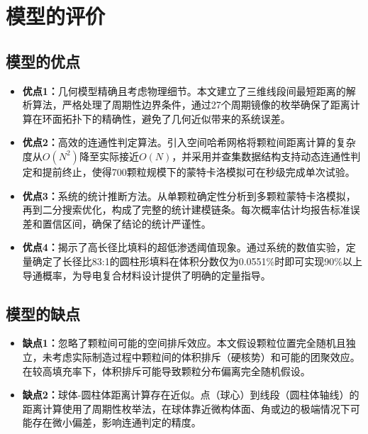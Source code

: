 
\section{模型的评价}

\subsection{模型的优点}
\begin{itemize}[itemindent=2em]
\item \textbf{优点1：}几何模型精确且考虑物理细节。本文建立了三维线段间最短距离的解析算法，严格处理了周期性边界条件，通过27个周期镜像的枚举确保了距离计算在环面拓扑下的精确性，避免了几何近似带来的系统误差。
\item \textbf{优点2：}高效的连通性判定算法。引入空间哈希网格将颗粒间距离计算的复杂度从$O(N^2)$降至实际接近$O(N)$，并采用并查集数据结构支持动态连通性判定和提前终止，使得700颗粒规模下的蒙特卡洛模拟可在秒级完成单次试验。
\item \textbf{优点3：}系统的统计推断方法。从单颗粒确定性分析到多颗粒蒙特卡洛模拟，再到二分搜索优化，构成了完整的统计建模链条。每次概率估计均报告标准误差和置信区间，确保了结论的统计严谨性。
\item \textbf{优点4：}揭示了高长径比填料的超低渗透阈值现象。通过系统的数值实验，定量确定了长径比83:1的圆柱形填料在体积分数仅为0.0551\%时即可实现90\%以上导通概率，为导电复合材料设计提供了明确的定量指导。
\end{itemize}

\subsection{模型的缺点}
\begin{itemize}[itemindent=2em]
\item \textbf{缺点1：}忽略了颗粒间可能的空间排斥效应。本文假设颗粒位置完全随机且独立，未考虑实际制造过程中颗粒间的体积排斥（硬核势）和可能的团聚效应。在较高填充率下，体积排斥可能导致颗粒分布偏离完全随机假设。
\item \textbf{缺点2：}球体-圆柱体距离计算存在近似。点（球心）到线段（圆柱体轴线）的距离计算使用了周期性枚举法，在球体靠近微构体面、角或边的极端情况下可能存在微小偏差，影响连通判定的精度。
\end{itemize}
